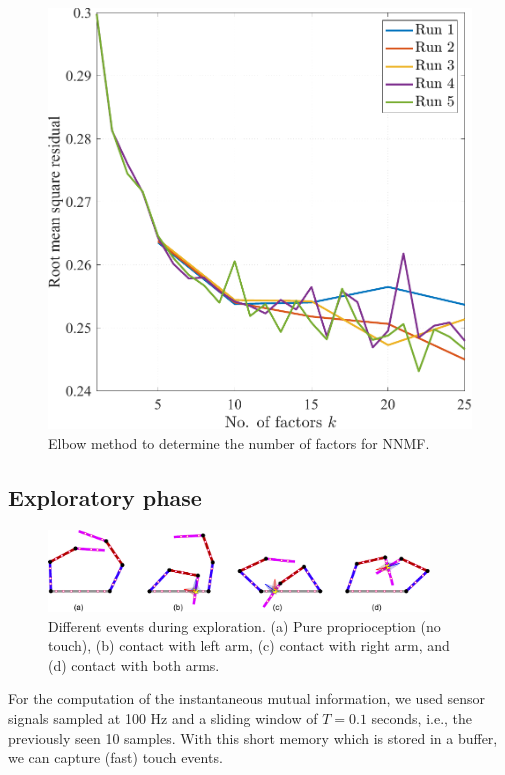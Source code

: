\begin{figure}[!th]
	\begin{center}
		\hspace*{\fill}
		\includegraphics[width=0.99\columnwidth]{nnmf_elbow.pdf}
		\hspace*{\fill}
	\end{center}
	\caption{\label{fig:nnmf_elbow} Elbow method to determine the number of factors for NNMF.}
\end{figure}

\subsection{Exploratory phase}
\begin{figure}[!ht]
	\centering
	\includegraphics[width=0.9\textwidth]{planar_dual_arm_modes.pdf}
	\caption{Different events during exploration. (a) Pure proprioception (no touch), (b) contact with left arm, (c) contact with right arm, and (d) contact with both arms.}
	\label{fig:planar_dual_arm_modes}
\end{figure}
For the computation of the instantaneous mutual information, we used sensor signals sampled at 100 Hz and a sliding window of $T = 0.1$ seconds, i.e., the previously seen 10 samples. With this short memory which is stored in a buffer, we can capture (fast) touch events.

